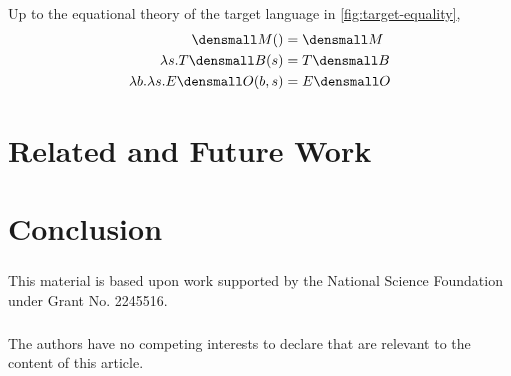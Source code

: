 \documentclass[runningheads]{llncs}
\begin{document}
\begin{proposition}
  Up to the equational theory of the target language in
  \cref{fig:target-equality},
  \begin{align*}
    \den{M}() &= \den{M}
    \\
    \lambda s. T\den{B}(s) &= T\den{B}
    \\
    \lambda b. \lambda s. E\den{O}(b, s) &= E\den{O}
  \end{align*}  
\end{proposition}

\section{Related and Future Work} \label{sec-future}

\section{Conclusion} \label{sec-conclusion}

\begin{credits}
\subsubsection{\ackname}
% 
This material is based upon work supported by the National Science Foundation
under Grant No. 2245516.

\subsubsection{\discintname}
%
The authors have no competing interests to declare that are
relevant to the content of this article.
\end{credits}
%
%
%


\end{document}
